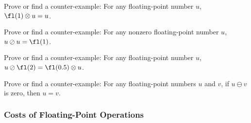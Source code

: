 \begin{xca}
  Prove or find a counter-example:
  For any floating-point number $u$, $\fl(1)\otimes u=u$.
\end{xca}

\begin{xca}
  Prove or find a counter-example:
  For any nonzero floating-point number $u$, $u\oslash u = \fl(1)$.
\end{xca}

\begin{xca}
  Prove or find a counter-example:
  For any floating-point number $u$, $u\oslash\fl(2) = \fl(0.5)\otimes u$.
\end{xca}

\begin{xca}
  Prove or find a counter-example:
  For any floating-point numbers $u$ and $v$,
  if $u\ominus v$ is zero, then $u=v$.
\end{xca}

\subsubsection{Costs of Floating-Point Operations}


